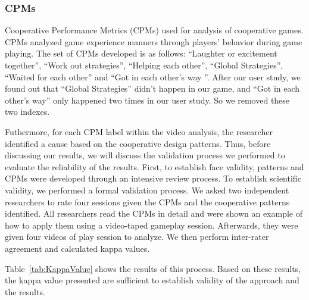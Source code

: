 \subsubsection{CPMs}

Cooperative Performance Metrics (CPMs)\cite{CPMs} used for analysis of cooperative games. CPMs analyzed game experience manners through players' behavior during game playing. The set of CPMs developed is as follows: ``Laughter or excitement together'', ``Work out strategies'', ``Helping each other'', ``Global Strategies'', ``Waited for each other'' and ``Got in each other's way ''. 
After our user study, we found out that ``Global Strategies'' didn't happen in our game, and ``Got in each other's way'' only happened two times in our user study. So we removed these two indexes.

Futhermore, for each CPM label within the video analysis, the researcher identified a cause based on the cooperative design patterns. Thus, before discussing our results, we will discuss the validation process we performed to evaluate the reliability of the results. First, to establish face validity, patterns and CPMs were developed through an intensive review process. To establish scientific validity, we performed a formal validation process. We asked two independent researchers to rate four sessions given the CPMs and the cooperative patterns identified. All researchers read the CPMs in detail and were shown an example of how to apply them using a video-taped gameplay session. Afterwards, they were given four videos of play session to analyze. We then perform inter-rater agreement and calculated kappa values\cite{Kappa1,Kappa2}. 

Table~\ref{tab:KappaValue} shows the results of this process. Based on these results, the kappa value presented are sufficient to establish validity of the approach and the results.

